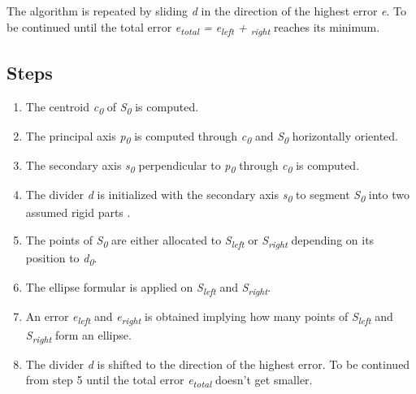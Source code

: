 The algorithm is repeated by sliding \textit{d} in the direction of the highest error \textit{e}. To be continued until the total error \textit{e\textsubscript{total} = e\textsubscript{left} + \textsubscript{right}} reaches its minimum.

\subsection{Steps}

\begin{enumerate}
	\item The centroid \textit{c\textsubscript{0}}  of \textit{S\textsubscript{0}} is computed.
	
	\item The principal axis \textit{p\textsubscript{0}} is computed through \textit{c\textsubscript{0}} and \textit{S\textsubscript{0}} horizontally oriented. 
	
	\item The secondary axis \textit{s\textsubscript{0}}  perpendicular to \textit{p\textsubscript{0}} through \textit{c\textsubscript{0}} is computed.
	
	\item The divider \textit{d} is initialized with the secondary axis \textit{s\textsubscript{0}} to segment \textit{S\textsubscript{0}} into two assumed rigid parts .
	
	\item The points of \textit{S\textsubscript{0}} are either allocated to \textit{S\textsubscript{left}} or \textit{S\textsubscript{right}} depending on its position to \textit{d\textsubscript{0}}.
	
	\item The ellipse formular is applied on \textit{S\textsubscript{left}} and \textit{S\textsubscript{right}}.
	
	\item An error \textit{e\textsubscript{left}} and \textit{e\textsubscript{right}} is obtained implying how many points of \textit{S\textsubscript{left}} and \textit{S\textsubscript{right}} form an ellipse. 
	
	\item The divider \textit{d} is shifted to the direction of the highest error. To be continued from step 5 until the total error \textit{e\textsubscript{total}} doesn't get smaller. 
\end{enumerate}